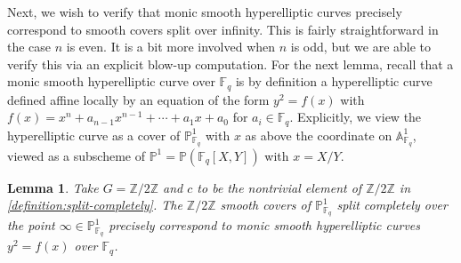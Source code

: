 \documentclass[12 pt]{amsart}
\theoremstyle{plain}
\newtheorem{lemma}[theorem]{Lemma}
\theoremstyle{definition}
\theoremstyle{remark}
\numberwithin{equation}{section}
\begin{document}
Next, we wish to verify that monic smooth hyperelliptic curves precisely correspond to
smooth covers split over infinity. This is fairly straightforward in the case $n$ is
even. It is a bit more involved when $n$ is odd, but we are able to verify this
via an explicit blow-up computation.
For the next lemma, recall that a monic smooth hyperelliptic curve over $\mathbb F_q$ is by definition a hyperelliptic curve defined affine locally 
by an equation of the form $y^2 =f(x)$ with 
$f(x) =  x^n + a_{n-1}x^{n-1} + \cdots + a_1x + a_0$ for $a_i \in \mathbb F_q$.
Explicitly, we view the hyperelliptic curve as a cover of $\mathbb P^1_{\mathbb
F_q}$ with $x$ as above the coordinate on $\mathbb A^1_{\mathbb F_q}$, viewed as a
subscheme of $\mathbb P^1 = \mathbb P (\mathbb F_q[X,Y])$ with $x = X/Y$.
\begin{lemma}
\label{lemma:hyperelliptics-split-over-infinity}
Take $G = \mathbb Z/2 \mathbb Z$ and $c$ to be the nontrivial element of
$\mathbb Z/2 \mathbb Z$ in \autoref{definition:split-completely}.
The $\mathbb Z/2 \mathbb Z$ smooth covers of $\mathbb P^1_{\mathbb F_q}$ split completely over the
point $\infty \in \mathbb P^1_{\mathbb F_q}$
precisely correspond to 
monic smooth hyperelliptic curves $y^2 = f(x)$ over
$\mathbb F_q$.
\end{lemma}
\end{document}

